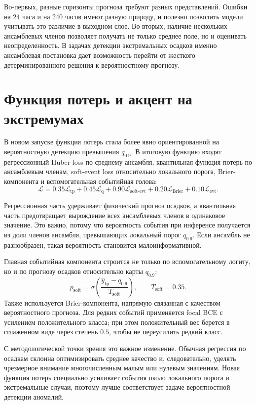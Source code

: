 Во-первых, разные горизонты прогноза требуют разных представлений. Ошибки на 24 часа и на 240 часов имеют разную природу, и полезно позволить модели учитывать это различие в выходном слое. Во-вторых, наличие нескольких ансамблевых членов позволяет получать не только среднее поле, но и оценивать неопределенность. В задачах детекции экстремальных осадков именно ансамблевая постановка дает возможность перейти от жесткого детерминированного решения к вероятностному прогнозу.

\section{Функция потерь и акцент на экстремумах}

В новом запуске функция потерь стала более явно ориентированной на вероятностную детекцию превышения \(q_{0.9}\). В итоговую функцию входят регрессионный Huber-loss по среднему ансамбля, квантильная функция потерь по ансамблевым членам, soft-event loss относительно локального порога, Brier-компонента и вспомогательная событийная голова:
\begin{equation}
\mathcal{L}=
0.35\mathcal{L}_{\text{tp}}+
0.45\mathcal{L}_{\text{q}}+
0.90\mathcal{L}_{\text{soft-evt}}+
0.20\mathcal{L}_{\text{Brier}}+
0.10\mathcal{L}_{\text{evt}}.
\end{equation}

Регрессионная часть удерживает физический прогноз осадков, а квантильная часть предотвращает вырождение всех ансамблевых членов в одинаковое значение. Это важно, потому что вероятность события при инференсе получается из доли членов ансамбля, превышающих локальный порог \(q_{0.9}\). Если ансамбль не разнообразен, такая вероятность становится малоинформативной.

Главная событийная компонента строится не только по вспомогательному логиту, но и по прогнозу осадков относительно карты \(q_{0.9}\):
\[
 p_{\text{soft}} = \sigma\left(\frac{\hat y_{\text{tp}}-q_{0.9}}{T_{\text{soft}}}\right),
 \qquad T_{\text{soft}}=0.35.
\]
Также используется Brier-компонента, напрямую связанная с качеством вероятностного прогноза. Для редких событий применяется focal BCE с усилением положительного класса; при этом положительный вес берется в сглаженном виде через степень \(0.5\), чтобы не переусилить редкий класс.

С методологической точки зрения это важное изменение. Обычная регрессия по осадкам склонна оптимизировать среднее качество и, следовательно, уделять чрезмерное внимание многочисленным малым или нулевым значениям. Новая функция потерь специально усиливает события около локального порога и экстремальные случаи, поэтому лучше соответствует задаче вероятностной детекции аномалий.

